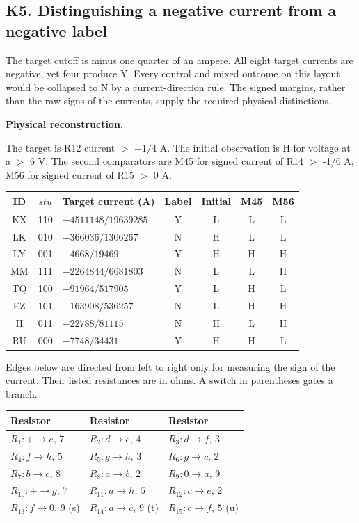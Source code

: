 \documentclass[12pt,letterpaper]{article}
\newcommand{\reading}[2]{\par\smallskip\textsf{\color{accent}\bfseries #1}\enspace #2\par}
\begin{document}
\clearpage\subsection*{K5. Distinguishing a negative current from a negative label}

The target cutoff is minus one quarter of an ampere. All eight target currents are negative, yet four produce Y. Every control and mixed outcome on this layout would be collapsed to N by a current-direction rule. The signed margins, rather than the raw signs of the currents, supply the required physical distinctions.

\reading{Physical reconstruction.}{} The target is R12 current $>$ $-1/4$ A. The initial observation is H for voltage at a $>$ 6 V. The second comparators are M45 for signed current of R14 $>$ -1/6 A, M56 for signed current of R15 $>$ 0 A.

\begin{center}{\small\setlength{\tabcolsep}{4pt}\begin{tabularx}{\linewidth}{@{}ccYcccc@{}}\toprule
ID & $stu$ & Target current (A) & Label & Initial & M45 & M56\\\midrule
KX & 110 & $-4511148/19639285$ & Y & L & L & L\\
LK & 010 & $-366036/1306267$ & N & H & L & L\\
LY & 001 & $-4668/19469$ & Y & H & H & H\\
MM & 111 & $-2264844/6681803$ & N & L & L & H\\
TQ & 100 & $-91964/517905$ & Y & L & H & L\\
EZ & 101 & $-163908/536257$ & N & L & H & H\\
II & 011 & $-22788/81115$ & N & H & L & H\\
RU & 000 & $-7748/34431$ & Y & H & H & L\\
\bottomrule\end{tabularx}}\end{center}

Edges below are directed from left to right only for measuring the sign of the current. Their listed resistances are in ohms. A switch in parentheses gates a branch.

\begin{center}{\footnotesize\setlength{\tabcolsep}{4pt}\begin{tabularx}{\linewidth}{@{}YYY@{}}\toprule
Resistor & Resistor & Resistor\\\midrule
$R_{1}: +\!\to\!e,\,7$ & $R_{2}: d\!\to\!e,\,4$ & $R_{3}: d\!\to\!f,\,3$\\
$R_{4}: f\!\to\!h,\,5$ & $R_{5}: g\!\to\!h,\,3$ & $R_{6}: g\!\to\!c,\,2$\\
$R_{7}: b\!\to\!c,\,8$ & $R_{8}: a\!\to\!b,\,2$ & $R_{9}: 0\!\to\!a,\,9$\\
$R_{10}: +\!\to\!g,\,7$ & $R_{11}: a\!\to\!h,\,5$ & $R_{12}: c\!\to\!e,\,2$\\
$R_{13}: f\!\to\!0,\,9$ (s) & $R_{14}: a\!\to\!c,\,9$ (t) & $R_{15}: c\!\to\!f,\,5$ (u)\\
\bottomrule\end{tabularx}}\end{center}
\end{document}
